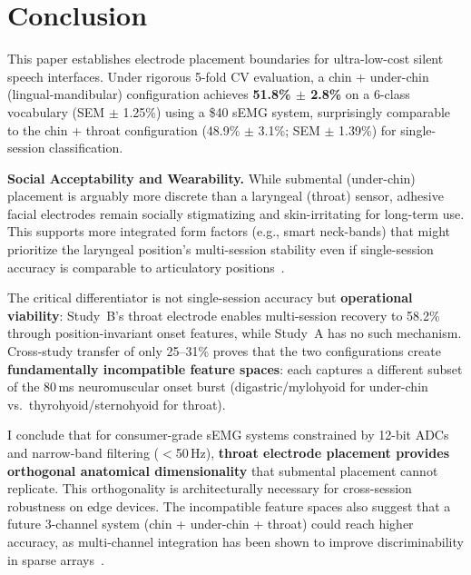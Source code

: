 \documentclass[11pt, a4paper]{article}
\begin{document}
\section{Conclusion}

This paper establishes electrode placement boundaries for ultra-low-cost silent speech interfaces. Under rigorous 5-fold CV evaluation, a chin + under-chin (lingual-mandibular) configuration achieves \textbf{51.8\% $\pm$ 2.8\%} on a 6-class vocabulary (SEM $\pm$ 1.25\%) using a \$40 sEMG system, surprisingly comparable to the chin + throat configuration (48.9\% $\pm$ 3.1\%; SEM $\pm$ 1.39\%) for single-session classification.

\textbf{Social Acceptability and Wearability.} While submental (under-chin) placement is arguably more discrete than a laryngeal (throat) sensor, adhesive facial electrodes remain socially stigmatizing and skin-irritating for long-term use. This supports more integrated form factors (e.g., smart neck-bands) that might prioritize the laryngeal position's multi-session stability even if single-session accuracy is comparable to articulatory positions~\cite{kapur2018}.

The critical differentiator is not single-session accuracy but \textbf{operational viability}: Study~B's throat electrode enables multi-session recovery to 58.2\% through position-invariant onset features, while Study~A has no such mechanism. Cross-study transfer of only 25--31\% proves that the two configurations create \textbf{fundamentally incompatible feature spaces}: each captures a different subset of the 80\,ms neuromuscular onset burst (digastric/mylohyoid for under-chin vs.\ thyrohyoid/sternohyoid for throat).

I conclude that for consumer-grade sEMG systems constrained by 12-bit ADCs and narrow-band filtering ($<$50\,Hz), \textbf{throat electrode placement provides orthogonal anatomical dimensionality} that submental placement cannot replicate. This orthogonality is architecturally necessary for cross-session robustness on edge devices. The incompatible feature spaces also suggest that a future 3-channel system (chin + under-chin + throat) could reach higher accuracy, as multi-channel integration has been shown to improve discriminability in sparse arrays~\cite{saejong2018}.

\end{document}
